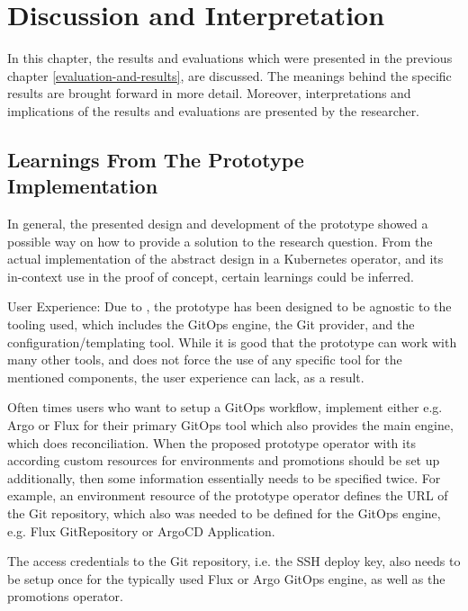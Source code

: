 \chapter{Discussion and Interpretation}
\label{discussion-and-interpretation}

In this chapter,
the results and evaluations which were presented in the previous chapter \ref{evaluation-and-results},
are discussed. The meanings behind the specific results are brought forward in more detail.
Moreover, interpretations and implications of the results and evaluations are presented by the researcher.


\section*{Learnings From The Prototype Implementation}

In general, the presented design and development of the prototype
showed a possible way on how to provide a solution to the research question.
From the actual implementation of the abstract design in a Kubernetes operator,
and its in-context use in the proof of concept,
certain learnings could be inferred.

User Experience:
Due to ,
the prototype has been designed to be agnostic to the tooling used, which includes the GitOps engine, the Git provider, and the configuration/templating tool.
While it is good that the prototype can work with many other tools,
and does not force the use of any specific tool for the mentioned components,
the user experience can lack, as a result.

Often times users who want to setup a GitOps workflow,
implement either e.g. Argo or Flux for their primary GitOps tool which also provides the main engine,
which does reconciliation.
When the proposed prototype operator with its according custom resources for environments and promotions
should be set up additionally,
then some information essentially needs to be specified twice. For example,
an environment resource of the prototype operator defines the URL of the Git repository,
which also was needed to be defined for the GitOps engine, e.g. Flux GitRepository or ArgoCD Application.

The access credentials to the Git repository, i.e. the SSH deploy key,
also needs to be setup once for the typically used Flux or Argo GitOps engine,
as well as the promotions operator.

